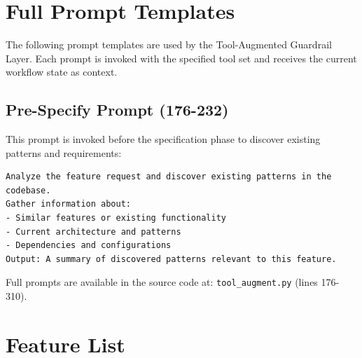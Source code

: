 \documentclass[sigconf,anonymous,review]{acmart}
\begin{document}




\nocite{SpecDrivenDevelopmentAI2026,SpecKitDocs,Jin2025KnowledgeDrivenMultiAgent,Gupta2025SLMsSDD}



\appendix
\section{Full Prompt Templates}

The following prompt templates are used by the Tool-Augmented Guardrail Layer. Each prompt is invoked with the specified tool set and receives the current workflow state as context.

\subsection{Pre-Specify Prompt (176-232)}

This prompt is invoked before the specification phase to discover existing patterns and requirements:
\begin{verbatim}
Analyze the feature request and discover existing patterns in the codebase.
Gather information about:
- Similar features or existing functionality
- Current architecture and patterns
- Dependencies and configurations
Output: A summary of discovered patterns relevant to this feature.
\end{verbatim}

Full prompts are available in the source code at:
\texttt{tool\_augment.py} (lines 176-310).

\section{Feature List}
\end{document}
